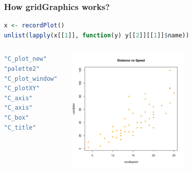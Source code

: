 \documentclass{beamer}
\begin{document}
\begin{frame}[fragile]
\frametitle{How \textbf{gridGraphics} works?}


\begin{lstlisting}[language = R]
x <- recordPlot()
unlist(lapply(x[[1]], function(y) y[[2]][[1]]$name))
\end{lstlisting}

\begin{columns}[c]
\begin{lstlisting}[language = R]
"C_plot_new"    
"palette2"      
"C_plot_window" 
"C_plotXY"      
"C_axis"        
"C_axis"       
"C_box"         
"C_title"    
\end{lstlisting}


\includegraphics[height = 6cm, width = 6cm]{plot/intro_1.pdf}

\end{columns}

\end{frame}



\end{document}
